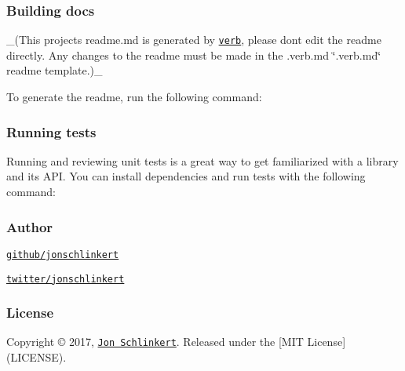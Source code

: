 {\ttfamily \subsubsection*{Building docs}}

{\ttfamily }

{\ttfamily \+\_\+(This project\textquotesingle{}s readme.\+md is generated by \href{https://github.com/verbose/verb-generate-readme}{\tt verb}, please don\textquotesingle{}t edit the readme directly. Any changes to the readme must be made in the .verb.\+md \char`\"{}.\+verb.\+md\char`\"{} readme template.)\+\_\+}

{\ttfamily To generate the readme, run the following command\+:}

{\ttfamily 
{}
}

{\ttfamily \subsubsection*{Running tests}}

{\ttfamily }

{\ttfamily Running and reviewing unit tests is a great way to get familiarized with a library and its A\+PI. You can install dependencies and run tests with the following command\+:}

{\ttfamily 
{}
}

{\ttfamily \subsubsection*{Author}}

{\ttfamily }

{}

{\ttfamily 
\begin{DoxyItemize}
\item \href{https://github.com/jonschlinkert}{\tt github/jonschlinkert}
\item \href{https://twitter.com/jonschlinkert}{\tt twitter/jonschlinkert}
\end{DoxyItemize}}

{\ttfamily \subsubsection*{License}}

{\ttfamily }

{\ttfamily Copyright © 2017, \href{https://github.com/jonschlinkert}{\tt Jon Schlinkert}. Released under the \mbox{[}M\+IT License\mbox{]}(L\+I\+C\+E\+N\+SE).}

{\ttfamily 

}

{ }